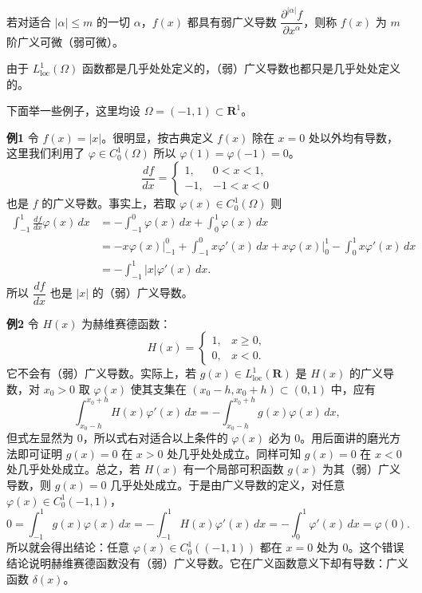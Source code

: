 若对适合 $|\alpha|\le m$ 的一切 $\alpha$，$f(x)$ 都具有弱广义导数 $\dfrac{\partial^{|\alpha|}f}{\partial x^\alpha}$，则称 $f(x)$ 为 $m$ 阶广义可微（弱可微）。

由于 $L^1_{\mathrm{loc}}(\Omega)$ 函数都是几乎处处定义的，（弱）广义导数也都只是几乎处处定义的。

下面举一些例子，这里均设 $\Omega=(-1,1)\subset\mathbf R^1$。

\noindent\textbf{例1}
令 $f(x)=|x|$。很明显，按古典定义 $f(x)$ 除在 $x=0$ 处以外均有导数，这里我们利用了 $\varphi\in C_0^1(\Omega)$ 所以 $\varphi(1)=\varphi(-1)=0$。
\[
 \frac{df}{dx}=
 \begin{cases}
 1,&0<x<1,\\
 -1,&-1<x<0
 \end{cases}
\]
也是 $f$ 的广义导数。事实上，若取 $\varphi(x)\in C_0^1(\Omega)$ 则
\[
\begin{aligned}
 \int_{-1}^1\frac{df}{dx}\varphi(x)\,dx
 &=-\int_{-1}^0\varphi(x)\,dx+\int_0^1\varphi(x)\,dx\\
 &=-x\varphi(x)\Big|_{-1}^0+\int_{-1}^0x\varphi'(x)\,dx
 +x\varphi(x)\Big|_0^1-\int_0^1x\varphi'(x)\,dx\\
 &=-\int_{-1}^1|x|\varphi'(x)\,dx.
\end{aligned}
\]
所以 $\dfrac{df}{dx}$ 也是 $|x|$ 的（弱）广义导数。

\noindent\textbf{例2}
令 $H(x)$ 为赫维赛德函数：
\[
 H(x)=
 \begin{cases}
 1,&x\ge0,\\
 0,&x<0.
 \end{cases}
\]
它不会有（弱）广义导数。实际上，若 $g(x)\in L^1_{\mathrm{loc}}(\mathbf R)$ 是 $H(x)$ 的广义导数，对 $x_0>0$ 取 $\varphi(x)$ 使其支集在 $(x_0-h,x_0+h)\subset(0,1)$ 中，应有
\[
 \int_{x_0-h}^{x_0+h}H(x)\varphi'(x)\,dx
 =-\int_{x_0-h}^{x_0+h}g(x)\varphi(x)\,dx,
\]
但式左显然为 0，所以式右对适合以上条件的 $\varphi(x)$ 必为 0。用后面讲的磨光方法即可证明 $g(x)=0$ 在 $x>0$ 处几乎处处成立。同样可知 $g(x)=0$ 在 $x<0$ 处几乎处处成立。总之，若 $H(x)$ 有一个局部可积函数 $g(x)$ 为其（弱）广义导数，则 $g(x)=0$ 几乎处处成立。于是由广义导数的定义，对任意 $\varphi(x)\in C_0^1(-1,1)$，
\[
 0=\int_{-1}^1g(x)\varphi(x)\,dx
 =-\int_{-1}^1H(x)\varphi'(x)\,dx
 =-\int_0^1\varphi'(x)\,dx=\varphi(0).
\]
所以就会得出结论：任意 $\varphi(x)\in C_0^1((-1,1))$ 都在 $x=0$ 处为 0。这个错误结论说明赫维赛德函数没有（弱）广义导数。它在广义函数意义下却有导数：广义函数 $\delta(x)$。

